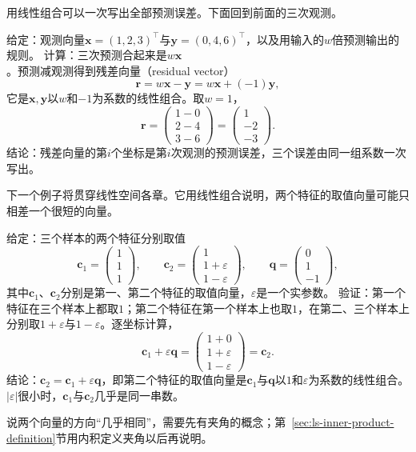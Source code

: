 用线性组合可以一次写出全部预测误差。下面回到前面的三次观测。
\begin{example}[残差向量是线性组合]
\label{ex:ls-residual-vector}
给定：观测向量$\bm x=(1,2,3)^\top$与$\bm y=(0,4,6)^\top$，以及用输入的$w$倍预测输出的规则。
计算：三次预测合起来是$w\bm x$。预测减观测得到残差向量（residual vector）
\[
 \bm r=w\bm x-\bm y=w\bm x+(-1)\bm y,
\]
它是$\bm x,\bm y$以$w$和$-1$为系数的线性组合。取$w=1$，
\[
 \bm r=\begin{pmatrix}1-0\\2-4\\3-6\end{pmatrix}=\begin{pmatrix}1\\-2\\-3\end{pmatrix}.
\]
结论：残差向量的第$i$个坐标是第$i$次观测的预测误差，三个误差由同一组系数一次写出。
\end{example}

下一个例子将贯穿线性空间各章。它用线性组合说明，两个特征的取值向量可能只相差一个很短的向量。
\begin{example}
\label{ex:ls-nearly-collinear-features}
给定：三个样本的两个特征分别取值
\[
 \bm c_1=\begin{pmatrix}1\\1\\1\end{pmatrix},\qquad
 \bm c_2=\begin{pmatrix}1\\1+\varepsilon\\1-\varepsilon\end{pmatrix},\qquad
 \bm q=\begin{pmatrix}0\\1\\-1\end{pmatrix},
\]
其中$\bm c_1$、$\bm c_2$分别是第一、第二个特征的取值向量，$\varepsilon$是一个实参数。
验证：第一个特征在三个样本上都取$1$；第二个特征在第一个样本上也取$1$，在第二、三个样本上分别取$1+\varepsilon$与$1-\varepsilon$。逐坐标计算，
\[
 \bm c_1+\varepsilon\bm q=\begin{pmatrix}1+0\\1+\varepsilon\\1-\varepsilon\end{pmatrix}=\bm c_2.
\]
结论：$\bm c_2=\bm c_1+\varepsilon\bm q$，即第二个特征的取值向量是$\bm c_1$与$\bm q$以$1$和$\varepsilon$为系数的线性组合。$|\varepsilon|$很小时，$\bm c_1$与$\bm c_2$几乎是同一串数。
\end{example}
说两个向量的方向“几乎相同”，需要先有夹角的概念；第~\ref{sec:ls-inner-product-definition}节用内积定义夹角以后再说明。

